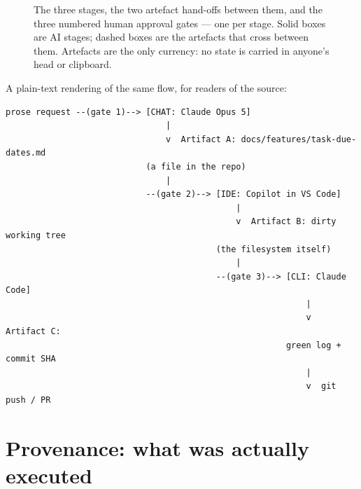 \documentclass[11pt,a4paper]{article}
\begin{document}
\begin{figure}[h]
\caption{The three stages, the two artefact hand-offs between them, and the
three numbered human approval gates --- one per stage. Solid boxes are AI
stages; dashed boxes are the artefacts that cross between them. Artefacts are
the only currency: no state is carried in anyone's head or clipboard.}
\end{figure}

\noindent A plain-text rendering of the same flow, for readers of the source:

\begin{lstlisting}[style=plain]
prose request --(gate 1)--> [CHAT: Claude Opus 5]
                                |
                                v  Artifact A: docs/features/task-due-dates.md
                            (a file in the repo)
                                |
                            --(gate 2)--> [IDE: Copilot in VS Code]
                                              |
                                              v  Artifact B: dirty working tree
                                          (the filesystem itself)
                                              |
                                          --(gate 3)--> [CLI: Claude Code]
                                                            |
                                                            v  Artifact C:
                                                        green log + commit SHA
                                                            |
                                                            v  git push / PR
\end{lstlisting}

\section{Provenance: what was actually executed}
\label{sec:provenance}
\end{document}
